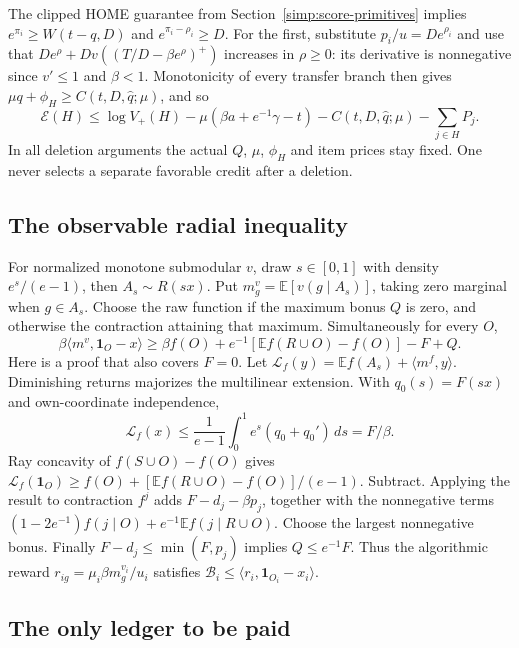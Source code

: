 The clipped HOME guarantee from Section~\ref{simp:score-primitives} implies
$e^{\pi_i}\ge W(t-q,D)$ and $e^{\pi_i-\rho_i}\ge D$.
For the first, substitute $p_i/u=De^{\rho_i}$ and use that
$De^\rho+Dv((T/D-\beta e^\rho)^+)$ increases in $\rho\ge0$:
its derivative is nonnegative since $v'\le1$ and $\beta<1$.
Monotonicity of every transfer branch then gives
$\mu q+\phi_H\ge C(t,D,\widehat q;\mu)$, and so
\begin{equation}\label{eq:paper-relaxed-scalar}
 \mathcal E(H)\le\log V_+(H)-\mu(\beta a+e^{-1}\gamma-t)
          -C(t,D,\widehat q;\mu)-\sum_{j\in H}P_j.
\end{equation}
In all deletion arguments the actual $Q$, $\mu$, $\phi_H$ and item prices
stay fixed. One never selects a separate favorable credit after a deletion.

\subsection{The observable radial inequality}

For normalized monotone submodular $v$, draw $s\in[0,1]$ with density
$e^s/(e-1)$, then $A_s\sim R(sx)$. Put
$m_g^v=\mathbb E[v(g\mid A_s)]$, taking zero marginal when $g\in A_s$.
Choose the raw function if the maximum bonus $Q$ is zero, and otherwise
the contraction attaining that maximum. Simultaneously for every $O$,
\begin{equation}\label{na:radial-ineq}
 \beta\langle m^v,\mathbf1_O-x\rangle
 \ge\beta f(O)+e^{-1}[\mathbb Ef(R\cup O)-f(O)]-F+Q.
\end{equation}
Here is a proof that also covers $F=0$. Let
$\mathcal L_f(y)=\mathbb Ef(A_s)+\langle m^f,y\rangle$.
Diminishing returns majorizes the multilinear extension. With
$q_0(s)=F(sx)$ and own-coordinate independence,
\[
 \mathcal L_f(x)\le\frac1{e-1}\int_0^1e^s(q_0+q_0')\,ds=F/\beta.
\]
Ray concavity of $f(S\cup O)-f(O)$ gives
$\mathcal L_f(\mathbf1_O)\ge f(O)+[\mathbb Ef(R\cup O)-f(O)]/(e-1)$.
Subtract. Applying the result to contraction $f^j$ adds
$F-d_j-\beta p_j$, together with the nonnegative terms
$(1-2e^{-1})f(j\mid O)+e^{-1}\mathbb Ef(j\mid R\cup O)$.
Choose the largest nonnegative bonus. Finally
$F-d_j\le\min(F,p_j)$ implies $Q\le e^{-1}F$.
Thus the algorithmic reward $r_{ig}=\mu_i\beta m_g^{v_i}/u_i$ satisfies
$\mathcal B_i\le\langle r_i,\mathbf1_{O_i}-x_i\rangle$.

\subsection{The only ledger to be paid}

